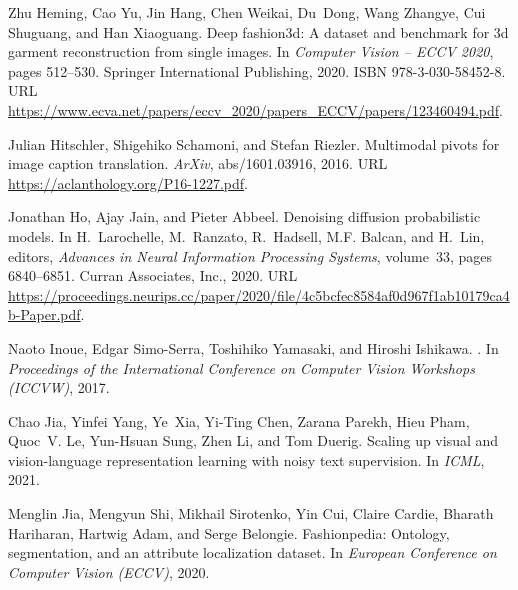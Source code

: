 \documentclass{bmvc2k}
\begin{document}
\begin{thebibliography}{63}
Zhu Heming, Cao Yu, Jin Hang, Chen Weikai, Du~Dong, Wang Zhangye, Cui Shuguang,
  and Han Xiaoguang.
\newblock Deep fashion3d: A dataset and benchmark for 3d garment reconstruction
  from single images.
\newblock In \emph{Computer Vision -- ECCV 2020}, pages 512--530. Springer
  International Publishing, 2020.
\newblock ISBN 978-3-030-58452-8.
\newblock URL
  \url{https://www.ecva.net/papers/eccv_2020/papers_ECCV/papers/123460494.pdf}.

Julian Hitschler, Shigehiko Schamoni, and Stefan Riezler.
\newblock Multimodal pivots for image caption translation.
\newblock \emph{ArXiv}, abs/1601.03916, 2016.
\newblock URL \url{https://aclanthology.org/P16-1227.pdf}.

Jonathan Ho, Ajay Jain, and Pieter Abbeel.
\newblock Denoising diffusion probabilistic models.
\newblock In H.~Larochelle, M.~Ranzato, R.~Hadsell, M.F. Balcan, and H.~Lin,
  editors, \emph{Advances in Neural Information Processing Systems}, volume~33,
  pages 6840--6851. Curran Associates, Inc., 2020.
\newblock URL
  \url{https://proceedings.neurips.cc/paper/2020/file/4c5bcfec8584af0d967f1ab10179ca4b-Paper.pdf}.

Naoto Inoue, Edgar Simo-Serra, Toshihiko Yamasaki, and Hiroshi Ishikawa.
.
\newblock In \emph{Proceedings of the International Conference on Computer
  Vision Workshops (ICCVW)}, 2017.

Chao Jia, Yinfei Yang, Ye~Xia, Yi-Ting Chen, Zarana Parekh, Hieu Pham, Quoc~V.
  Le, Yun-Hsuan Sung, Zhen Li, and Tom Duerig.
\newblock Scaling up visual and vision-language representation learning with
  noisy text supervision.
\newblock In \emph{ICML}, 2021.

Menglin Jia, Mengyun Shi, Mikhail Sirotenko, Yin Cui, Claire Cardie, Bharath
  Hariharan, Hartwig Adam, and Serge Belongie.
\newblock Fashionpedia: Ontology, segmentation, and an attribute localization
  dataset.
\newblock In \emph{European Conference on Computer Vision (ECCV)}, 2020.


\end{thebibliography}
\end{document}
